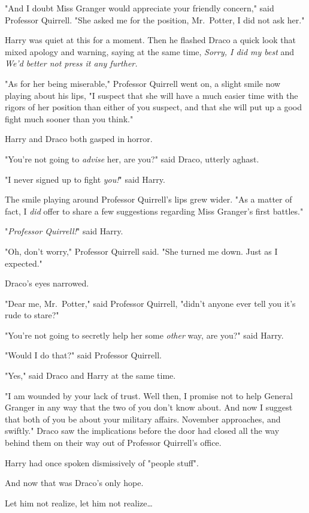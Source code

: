 "And I doubt Miss Granger would appreciate your friendly concern," said 
Professor Quirrell. "She asked me for the position, Mr.~Potter, I did not ask 
her."

Harry was quiet at this for a moment. Then he flashed Draco a quick look that 
mixed apology and warning, saying at the same time, \emph{Sorry, I did my best} 
and \emph{We'd better not press it any further.}

"As for her being miserable," Professor Quirrell went on, a slight smile now 
playing about his lips, "I suspect that she will have a much easier time with 
the rigors of her position than either of you suspect, and that she will put up 
a good fight much sooner than you think."

Harry and Draco both gasped in horror.

"You're not going to \emph{advise} her, are you?" said Draco, utterly aghast.

"I never signed up to fight \emph{you!}" said Harry.

The smile playing around Professor Quirrell's lips grew wider. "As a matter of 
fact, I \emph{did} offer to share a few suggestions regarding Miss Granger's 
first battles."

"\emph{Professor Quirrell!}" said Harry.

"Oh, don't worry," Professor Quirrell said. "She turned me down. Just as I 
expected."

Draco's eyes narrowed.

"Dear me, Mr.~Potter," said Professor Quirrell, "didn't anyone ever tell you 
it's rude to stare?"

"You're not going to secretly help her some \emph{other} way, are you?" said 
Harry.

"Would I do that?" said Professor Quirrell.

"Yes," said Draco and Harry at the same time.

"I am wounded by your lack of trust. Well then, I promise not to help General 
Granger in any way that the two of you don't know about. And now I suggest that 
both of you be about your military affairs. November approaches, and swiftly."
\sbreak
Draco saw the implications before the door had closed all the way behind them 
on their way out of Professor Quirrell's office.

Harry had once spoken dismissively of "people stuff".

And now that was Draco's only hope.

Let him not realize, let him not realize{\ldots}

